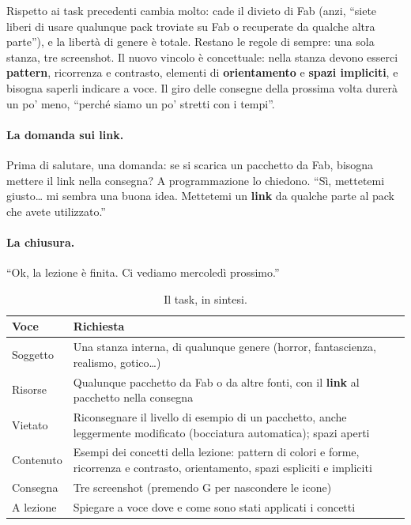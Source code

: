 Rispetto ai task precedenti cambia molto: cade il divieto di Fab (anzi, ``siete liberi di
usare qualunque pack troviate su Fab o recuperate da qualche altra parte''), e la libertà
di genere è totale. Restano le regole di sempre: una sola stanza, tre screenshot. Il
nuovo vincolo è concettuale: nella stanza devono esserci \textbf{pattern}, ricorrenza e
contrasto, elementi di \textbf{orientamento} e \textbf{spazi impliciti}, e bisogna saperli
indicare a voce. Il giro delle consegne della prossima volta durerà un po' meno, ``perché
siamo un po' stretti con i tempi''.

\paragraph{La domanda sui link.} Prima di salutare, una domanda: se si scarica un pacchetto
da Fab, bisogna mettere il link nella consegna? A programmazione lo chiedono. ``Sì,
mettetemi giusto\ldots{} mi sembra una buona idea. Mettetemi un \textbf{link} da qualche
parte al pack che avete utilizzato.''

\paragraph{La chiusura.} ``Ok, la lezione è finita. Ci vediamo mercoledì prossimo.''

\begin{table}[ht]
\centering
\small
\begin{tabular}{@{}p{}p{}@{}}
\toprule
\textbf{Voce} & \textbf{Richiesta} \\
\midrule
Soggetto & Una stanza interna, di qualunque genere (horror, fantascienza, realismo,
  gotico\ldots) \\
Risorse & Qualunque pacchetto da Fab o da altre fonti, con il \textbf{link} al pacchetto
  nella consegna \\
Vietato & Riconsegnare il livello di esempio di un pacchetto, anche leggermente
  modificato (bocciatura automatica); spazi aperti \\
Contenuto & Esempi dei concetti della lezione: pattern di colori e forme, ricorrenza e
  contrasto, orientamento, spazi espliciti e impliciti \\
Consegna & Tre screenshot (premendo G per nascondere le icone) \\
A lezione & Spiegare a voce dove e come sono stati applicati i concetti \\
\bottomrule
\end{tabular}
\caption{Il task, in sintesi.}
\label{gd17:tab:task}
\end{table}

